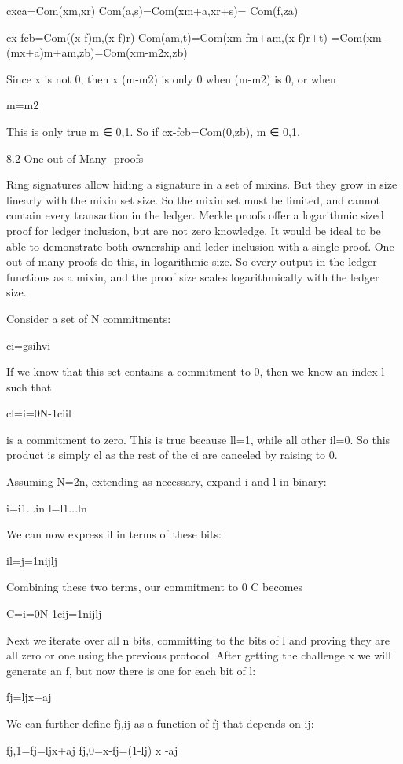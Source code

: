 \documentclass{article}
\begin{document}
	cxca=Com(xm,xr) Com(a,s)=Com(xm+a,xr+s)= Com(f,za)

	cx-fcb=Com((x-f)m,(x-f)r) Com(am,t)=Com(xm-fm+am,(x-f)r+t)
	         =Com(xm-(mx+a)m+am,zb)=Com(xm-m2x,zb)

Since x is not 0, then x (m-m2) is only 0 when (m-m2) is 0, or when

	m=m2

This is only true m ∈ {0,1}.  So if cx-fcb=Com(0,zb), m ∈ {0,1}.


8.2 One out of Many -proofs

Ring signatures allow hiding a signature in a set of mixins.  But they grow in size linearly with the mixin set size.  So the mixin set must be limited, and cannot contain every transaction in the ledger.  Merkle proofs offer a logarithmic sized proof for ledger inclusion, but are not zero knowledge.  It would be ideal to be able to demonstrate both ownership and leder inclusion with a single proof.  One out of many proofs do this, in logarithmic size.  So every output in the ledger functions as a mixin, and the proof size scales logarithmically with the ledger size.

Consider a set of N commitments:

	ci=gsihvi

If we know that this set contains a commitment to 0, then we know an index l such that

	cl=i=0N-1ciil

is a commitment to zero.  This is true because ll=1, while all other il=0. So this product is simply cl as the rest of the ci are canceled by raising to 0.

Assuming N=2n, extending as necessary, expand i and l in binary:

	i=i1...in
	l=l1...ln

We can now express il in terms of these bits:

	il=j=1nijlj

Combining these two terms, our commitment to 0 C becomes

	C=i=0N-1cij=1nijlj

Next we iterate over all n bits, committing to the bits of l and proving they are all zero or one using the previous protocol.  After getting the challenge x we will generate an f, but now there is one for each bit of l:

	fj=ljx+aj

We can further define fj,ij as a function of fj that depends on ij:

	fj,1=fj=ljx+aj
	fj,0=x-fj=(1-lj) x -aj
\end{document}

